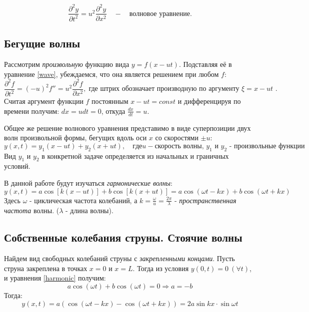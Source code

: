 \documentclass[
a4paper, %
12pt, %
]{article}
\begin{document}
	\begin{equation}\label{wave}
			\frac{\partial^2 y}{\partial t^2} = u^2 \frac{\partial^2 y}{\partial x^2} \quad - \quad \text{волновое уравнение.}
	\end{equation}
	
	\newpage
	
	\subsection{Бегущие волны}
	Рассмотрим \textit{произвольную} функцию вида $y = f(x - ut)$. Подставляя её в уравнение \eqref{wave}, убеждаемся, что она является решением при любом $f$:
	\begin{equation}
		\frac{\partial^2 f}{\partial t^2} = (-u)^2 f'' = u^2 \frac{\partial^2 f}{\partial x^2}, \; \text{где штрих обозначает производную по аргументу $\xi = x - ut$ .}
	\end{equation}
	Считая аргумент функции $f$ постоянным $x - ut = const$ и дифференцируя по времени получим: $dx = udt = 0$, откуда $\frac{dx}{dt} = u$.
	
	Общее же решение волнового уравнения представимо в виде суперпозиции двух волн произвольной формы, бегущих вдоль оси $x$ со скоростями $\pm u$:
	\begin{equation}
		y(x,t) = y_1(x-ut) + y_2(x+ut), \quad где u - \text{скорость волны, $y_1$ и $y_2$ - произвольные функции}
	\end{equation}
	Вид $y_1$ и $y_2$ в конкретной задаче определяется из начальных и граничных условий.
	
	В данной работе будут изучаться \textit{гармонические волны}:
	\begin{equation}\label{harmonic}
		y(x,t) = a \cos\left[k(x - ut)\right] + b \cos\left[k(x+ut)\right] = a\cos\left(\omega t - kx\right) + b\cos\left(\omega t + kx\right)
	\end{equation}
	Здесь $\omega$ - циклическая частота колебаний, а $k = \frac{\omega}{u} = \frac{2\pi}{\lambda}$ - \textit{пространственная частота} волны. ($\lambda$ - длина волны).
	
	\newpage
	
	\subsection{Собственные колебания струны. Стоячие волны}
	
	Найдем вид свободных колебаний струны с \textit{закрепленными концами}. Пусть струна закреплена в точках $x = 0$ и $x = L$. Тогда из условия $y(0, t) = 0 \ (\forall t)$, и уравнения \ref{harmonic} получим:
	\begin{equation}
		a \cos(\omega t) + b \cos(\omega t) = 0 \Rightarrow a = -b
	\end{equation} 
	Тогда:
	\begin{equation}\label{harmonic_shortened}
		y(x,t) = a(\cos(\omega t - k x) - \cos(\omega t + k x)) = 2 a \sin{kx} \cdot \sin{\omega t}
	\end{equation}
	
\end{document}

